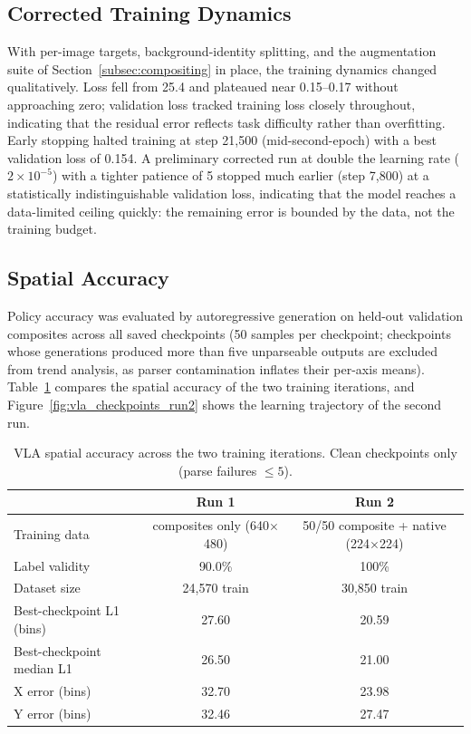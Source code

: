 \subsection{Corrected Training Dynamics}
\label{subsec:res_training}

With per-image targets, background-identity splitting, and the augmentation suite of Section~\ref{subsec:compositing} in place, the training dynamics changed qualitatively. Loss fell from 25.4 and plateaued near 0.15--0.17 without approaching zero; validation loss tracked training loss closely throughout, indicating that the residual error reflects task difficulty rather than overfitting. Early stopping halted training at step 21{,}500 (mid-second-epoch) with a best validation loss of 0.154. A preliminary corrected run at double the learning rate ($2 \times 10^{-5}$) with a tighter patience of 5 stopped much earlier (step 7{,}800) at a statistically indistinguishable validation loss, indicating that the model reaches a data-limited ceiling quickly: the remaining error is bounded by the data, not the training budget.

\subsection{Spatial Accuracy}
\label{subsec:res_spatial}
 
Policy accuracy was evaluated by autoregressive generation on held-out
validation composites across all saved checkpoints (50 samples per
checkpoint; checkpoints whose generations produced more than five unparseable
outputs are excluded from trend analysis, as parser contamination inflates
their per-axis means). Table~\ref{tab:vla_comparison} compares the spatial
accuracy of the two training iterations, and
Figure~\ref{fig:vla_checkpoints_run2} shows the learning trajectory of the
second run.
 
\begin{table}[htbp]
    \centering
    \caption{VLA spatial accuracy across the two training iterations.
    Clean checkpoints only (parse failures $\leq 5$).}
    \label{tab:vla_comparison}
    \begin{tabular}{lcc}
        \toprule
        & \textbf{Run 1} & \textbf{Run 2} \\
        \midrule
        Training data & composites only (640$\times$480) & 50/50 composite + native (224$\times$224) \\
        Label validity & 90.0\% & 100\% \\
        Dataset size & 24{,}570 train & 30{,}850 train \\
        Best-checkpoint L1 (bins) & 27.60 & 20.59 \\
        Best-checkpoint median L1 & 26.50 & 21.00 \\
        X error (bins) & 32.70 & 23.98 \\
        Y error (bins) & 32.46 & 27.47 \\
        \bottomrule
    \end{tabular}
\end{table}
 
